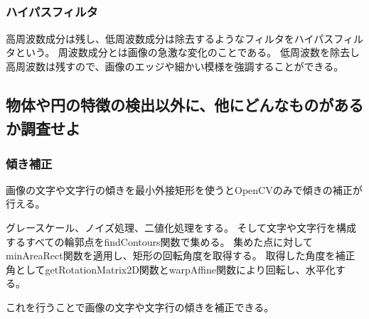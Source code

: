 \documentclass{jlreq}
\begin{document}
\subsubsection{ハイパスフィルタ\textsuperscript{\cite{Highpath}}}
高周波数成分は残し、低周波数成分は除去するようなフィルタをハイパスフィルタという。
周波数成分とは画像の急激な変化のことである。
低周波数を除去し高周波数は残すので、画像のエッジや細かい模様を強調することができる。

\subsection{物体や円の特徴の検出以外に、他にどんなものがあるか調査せよ\textsuperscript{\cite{Katamuki}}}
\subsubsection{傾き補正}
画像の文字や文字行の傾きを最小外接矩形を使うとOpenCVのみで傾きの補正が行える。

グレースケール、ノイズ処理、二値化処理をする。
そして文字や文字行を構成するすべての輪郭点をfindContours関数で集める。
集めた点に対してminAreaRect関数を適用し、矩形の回転角度を取得する。
取得した角度を補正角としてgetRotationMatrix2D関数とwarpAffine関数により回転し、水平化する。

これを行うことで画像の文字や文字行の傾きを補正できる。

\printbibliography[title=参考文献]
\end{document}
